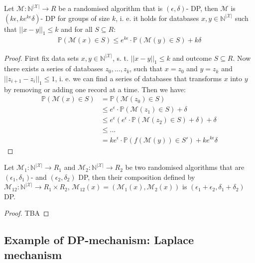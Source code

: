 \begin{thm}
    Let $\mathcal{M}: \mathbb{N}^{|\mathcal{X}|} \rightarrow R$ be a randomised algorithm that is $(\epsilon, \delta)$- DP, then $\mathcal{M}$ is $(k\epsilon, k e^{k\epsilon} \delta)$- DP for groups of size $k$, i. e. it holds for databases $x,y \in \mathbb{N}^{|\mathcal{X}|}$ such that $||x-y||_1\le k$ and for all $S \subseteq R$:
    \begin{align}
        \mathbb{P}(\mathcal{M}(x) \in S) \le e^{k\epsilon} \cdot \mathbb{P}(\mathcal{M}(y) \in S) + k\delta 
    \end{align}
\end{thm}
\begin{proof}
    First fix data sets $x,y \in \mathbb{N}^{|\mathcal{X}|}$, s. t. $||x-y||_1\le k$ and outcome $S \subseteq R$. Now there exists a series of databases $z_0,..., z_k$, such that $x=z_0$ and $y=z_k$ and $|| z_{i+1} - z_i||_1 \le 1$, i. e. we can find a series of databases that transforms $x$ into $y$ by removing or adding one record at a time. Then we have:
    \begin{align}
        \mathbb{P}(\mathcal{M}(x)\in S) &= \mathbb{P}(\mathcal{M}(z_0)\in S) \nonumber \\
        &\le e^\epsilon \cdot \mathbb{P}(\mathcal{M}(z_1)\in S) + \delta \nonumber \\
        &\le e^\epsilon \left( e^\epsilon \cdot \mathbb{P}(\mathcal{M}(z_2)\in S) + \delta \right) + \delta \nonumber \\
        &\le ... \nonumber \\
        &= k e^\epsilon \cdot \mathbb{P}(f(\mathcal{M}(y))\in S') + k e^{k \epsilon} \delta
    \end{align}
\end{proof}

\begin{thm}
    Let $\mathcal{M}_1: \mathbb{N}^{|\mathcal{X}|} \rightarrow R_1$ and $\mathcal{M}_2: \mathbb{N}^{|\mathcal{X}|} \rightarrow R_2$ be two randomised algorithms that are $(\epsilon_1, \delta_1)$- and $(\epsilon_2, \delta_2)$ DP, then their composition defined by $\mathcal{M}_{12}: \mathbb{N}^{|\mathcal{X}|} \rightarrow R_1 \times R_2$, $\mathcal{M}_{12}(x)=(\mathcal{M}_{1}(x), \mathcal{M}_{2}(x))$ is $(\epsilon_1+\epsilon_2, \delta_1+\delta_2)$ DP.
\end{thm}
\begin{proof}
    TBA
\end{proof}

\subsection{Example of DP-mechanism: Laplace mechanism}